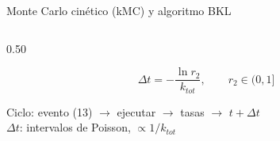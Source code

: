 \documentclass[aspectratio=169,11pt]{beamer}
\begin{document}
\begin{frame}{Monte Carlo cinético (kMC) y algoritmo BKL}
\begin{columns}[c,onlytextwidth]
\begin{column}{0.50\textwidth}
      \begin{block}{}
        \vspace{-0.3em}
        \begin{equation}
          \Delta t = -\frac{\ln r_2}{k_{tot}}, \qquad r_2\in(0,1] \tag{14}
        \end{equation}
      \end{block}
      {\footnotesize Ciclo: evento (13) $\to$ ejecutar $\to$ tasas $\to$ $t+\Delta t$\\
      {\color{gris}$\Delta t$: intervalos de Poisson, $\propto 1/k_{tot}$}}
    \end{column}
  \end{columns}
\end{frame}

\end{document}
